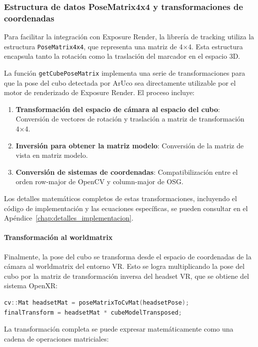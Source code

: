 \subsubsection{Estructura de datos PoseMatrix4x4 y transformaciones de coordenadas}

Para facilitar la integración con Exposure Render, la librería de tracking utiliza la estructura \texttt{PoseMatrix4x4}, que representa una matriz de 4×4. Esta estructura encapsula tanto la rotación como la traslación del marcador en el espacio 3D.

La función \texttt{getCubePoseMatrix} implementa una serie de transformaciones para que la pose del cubo detectada por ArUco sea directamente utilizable por el motor de renderizado de Exposure Render. El proceso incluye:

\begin{enumerate}
    \item \textbf{Transformación del espacio de cámara al espacio del cubo}: Conversión de vectores de rotación y traslación a matriz de transformación 4×4.
    \item \textbf{Inversión para obtener la matriz modelo}: Conversión de la matriz de vista en matriz modelo.
    \item \textbf{Conversión de sistemas de coordenadas}: Compatibilización entre el orden row-major de OpenCV y column-major de OSG.
\end{enumerate}

Los detalles matemáticos completos de estas transformaciones, incluyendo el código de implementación y las ecuaciones específicas, se pueden consultar en el Apéndice~\ref{chap:detalles_implementacion}.




\paragraph{Transformación al \gls{worldmatrix}}
Finalmente, la pose del cubo se transforma desde el espacio de coordenadas de la cámara al \gls{worldmatrix} del entorno VR. Esto se logra multiplicando la pose del cubo por la matriz de transformación inversa del headset VR, que se obtiene del sistema OpenXR:

\begin{lstlisting}[language=C++]
cv::Mat headsetMat = poseMatrixToCvMat(headsetPose);
finalTransform = headsetMat * cubeModelTransposed;
\end{lstlisting}

La transformación completa se puede expresar matemáticamente como una cadena de operaciones matriciales:

